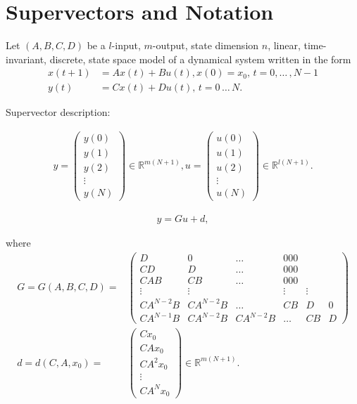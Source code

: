\documentclass[12pt,ngerman]{article}
\begin{document}
	

	\section{Supervectors and Notation}
	
     Let $(A,B,C,D)$ be a $l$-input, $m$-output, state dimension $n$, linear, time-invariant, discrete, state space model of a dynamical system written in the form 
     \begin{align*}
     x(t+1) &= Ax(t) + B u(t), x(0) = x_0, \, t = 0, \dots \, , N-1\\
     y(t) &= Cx(t) + D u(t), \, t  = 0\, \dots \, N.
     \end{align*}
     
     Supervector description: 
     
	\begin{align*}
	y = \begin{pmatrix}
	y(0) \\ y(1) \\ y(2) \\ \vdots \\ y(N)
	\end{pmatrix} \in \mathbb{R}^{m(N+1)},
	u = \begin{pmatrix}
	u(0) \\ u(1) \\ u(2) \\ \vdots \\ u(N)
	\end{pmatrix} \in \mathbb{R}^{l(N+1)}.
	\end{align*}
	
	
	\begin{align*}
	y = Gu + d,
	\end{align*}
	
	where 
	\begin{align*}
	G = G(A, B, C, D) =&
	 \begin{pmatrix}
	D & 0 & \dots & 0 0 0 \\
	CD & D & \dots & 0 0 0\\
	CAB & CB & \dots & 0 0 0\\
	\vdots & \vdots & & \vdots & \vdots\\
	CA^{N-2}B & CA^{N-2}B & \dots & CB & D &0\\
	CA^{N-1}B & CA^{N-2}B & CA^{N-2}B & \dots &CB & D
	\end{pmatrix}\\
	d = d(C, A, x_0) = & \begin{pmatrix}
	Cx_0 \\ CAx_0 \\ CA^2x_0 \\ \vdots \\ CA^N x_0
	\end{pmatrix} \in \mathbb{R}^{m(N+1)}.
	\end{align*}
	
\end{document}
